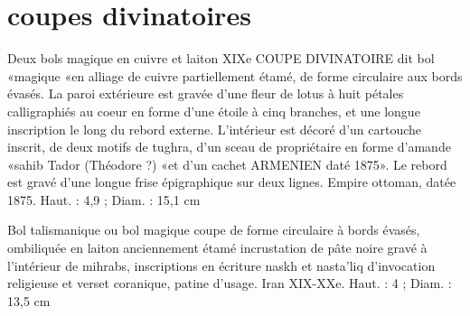 \chapter{coupes divinatoires}

Deux bols magique en cuivre et laiton XIXe
COUPE DIVINATOIRE dit bol «magique «en alliage de cuivre partiellement étamé, de forme circulaire aux bords évasés. La paroi extérieure est gravée d'une fleur de lotus à huit pétales calligraphiés au coeur en forme d'une étoile à cinq branches, et une longue inscription le long du rebord externe. L'intérieur est décoré d'un cartouche inscrit, de deux motifs de tughra, d'un sceau de propriétaire en forme d'amande «sahib Tador (Théodore ?) «et d'un cachet ARMENIEN daté 1875». Le rebord est gravé d'une longue frise épigraphique sur deux lignes. Empire ottoman, datée 1875.
Haut. : 4,9 ; Diam. : 15,1 cm




Bol talismanique ou bol magique coupe de forme circulaire à bords évasés, ombiliquée en laiton anciennement étamé incrustation de pâte noire gravé à l'intérieur de mihrabs, inscriptions en écriture naskh et nasta'liq d'invocation religieuse et verset coranique, patine d'usage. Iran XIX-XXe.
Haut. : 4 ; Diam. : 13,5 cm